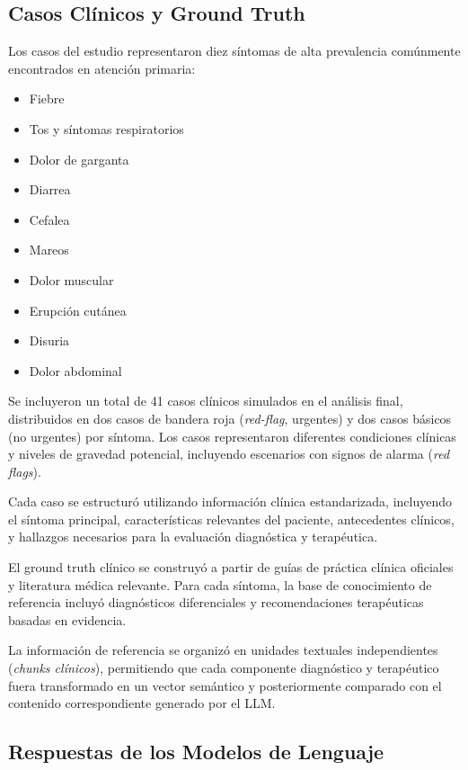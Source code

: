 \documentclass[final,11pt,3p]{elsarticle}
\begin{document}
\subsection{Casos Clínicos y Ground Truth}
\label{S:2.2}

Los casos del estudio representaron diez síntomas de alta prevalencia comúnmente encontrados en atención primaria:

\begin{itemize}
    \item Fiebre
    \item Tos y síntomas respiratorios
    \item Dolor de garganta
    \item Diarrea
    \item Cefalea
    \item Mareos
    \item Dolor muscular
    \item Erupción cutánea
    \item Disuria
    \item Dolor abdominal
\end{itemize}

Se incluyeron un total de 41 casos clínicos simulados en el análisis final, distribuidos en dos casos de bandera roja (\textit{red-flag}, urgentes) y dos casos básicos (no urgentes) por síntoma. Los casos representaron diferentes condiciones clínicas y niveles de gravedad potencial, incluyendo escenarios con signos de alarma (\textit{red flags}).

Cada caso se estructuró utilizando información clínica estandarizada, incluyendo el síntoma principal, características relevantes del paciente, antecedentes clínicos, y hallazgos necesarios para la evaluación diagnóstica y terapéutica.

El ground truth clínico se construyó a partir de guías de práctica clínica oficiales y literatura médica relevante. Para cada síntoma, la base de conocimiento de referencia incluyó diagnósticos diferenciales y recomendaciones terapéuticas basadas en evidencia.

La información de referencia se organizó en unidades textuales independientes (\textit{chunks clínicos}), permitiendo que cada componente diagnóstico y terapéutico fuera transformado en un vector semántico y posteriormente comparado con el contenido correspondiente generado por el LLM.

\subsection{Respuestas de los Modelos de Lenguaje}
\label{S:2.3}
\end{document}
